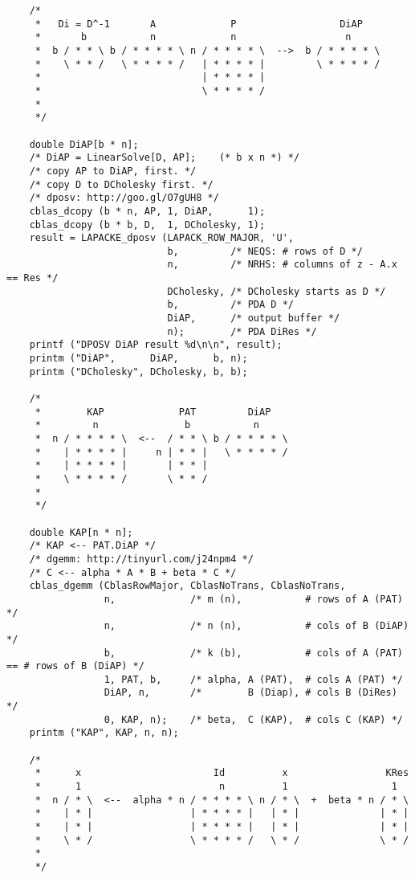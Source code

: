 \documentclass[10pt,oneside,x11names]{article}
\begin{document}
\begin{verbatim}
    /*
     *   Di = D^-1       A             P                  DiAP
     *       b           n             n                   n
     *  b / * * \ b / * * * * \ n / * * * * \  -->  b / * * * * \
     *    \ * * /   \ * * * * /   | * * * * |         \ * * * * /
     *                            | * * * * |
     *                            \ * * * * /
     *
     */

    double DiAP[b * n];
    /* DiAP = LinearSolve[D, AP];    (* b x n *) */
    /* copy AP to DiAP, first. */
    /* copy D to DCholesky first. */
    /* dposv: http://goo.gl/O7gUH8 */
    cblas_dcopy (b * n, AP, 1, DiAP,      1);
    cblas_dcopy (b * b, D,  1, DCholesky, 1);
    result = LAPACKE_dposv (LAPACK_ROW_MAJOR, 'U',
                            b,         /* NEQS: # rows of D */
                            n,         /* NRHS: # columns of z - A.x == Res */
                            DCholesky, /* DCholesky starts as D */
                            b,         /* PDA D */
                            DiAP,      /* output buffer */
                            n);        /* PDA DiRes */
    printf ("DPOSV DiAP result %d\n\n", result);
    printm ("DiAP",      DiAP,      b, n);
    printm ("DCholesky", DCholesky, b, b);

    /*
     *        KAP             PAT         DiAP
     *         n               b           n
     *  n / * * * * \  <--  / * * \ b / * * * * \
     *    | * * * * |     n | * * |   \ * * * * /
     *    | * * * * |       | * * |
     *    \ * * * * /       \ * * /
     *
     */

    double KAP[n * n];
    /* KAP <-- PAT.DiAP */
    /* dgemm: http://tinyurl.com/j24npm4 */
    /* C <-- alpha * A * B + beta * C */
    cblas_dgemm (CblasRowMajor, CblasNoTrans, CblasNoTrans,
                 n,             /* m (n),           # rows of A (PAT) */
                 n,             /* n (n),           # cols of B (DiAP) */
                 b,             /* k (b),           # cols of A (PAT) == # rows of B (DiAP) */
                 1, PAT, b,     /* alpha, A (PAT),  # cols A (PAT) */
                 DiAP, n,       /*        B (Diap), # cols B (DiRes) */
                 0, KAP, n);    /* beta,  C (KAP),  # cols C (KAP) */
    printm ("KAP", KAP, n, n);

    /*
     *      x                       Id          x                 KRes
     *      1                        n          1                  1
     *  n / * \  <--  alpha * n / * * * * \ n / * \  +  beta * n / * \
     *    | * |                 | * * * * |   | * |              | * |
     *    | * |                 | * * * * |   | * |              | * |
     *    \ * /                 \ * * * * /   \ * /              \ * /
     *
     */


\end{verbatim}
\end{document}
